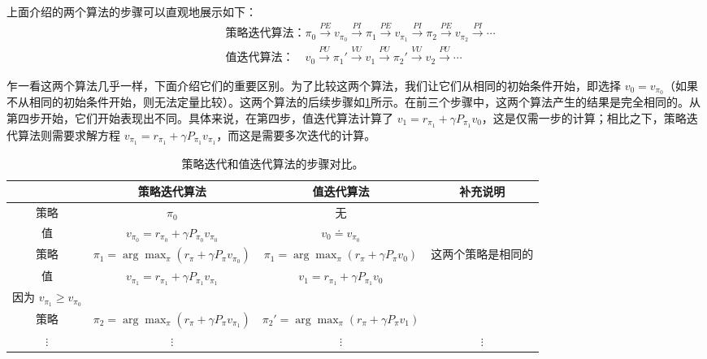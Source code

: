 上面介绍的两个算法的步骤可以直观地展示如下：
$$
\begin{aligned}
&\text{策略迭代算法：} \pi_{0} \xrightarrow{PE} v_{\pi_{0}} \xrightarrow{PI} \pi_{1} \xrightarrow{PE} v_{\pi_{1}} \xrightarrow{PI} \pi_{2} \xrightarrow{PE} v_{\pi_{2}} \xrightarrow{PI} \cdots \\
&\text{值迭代算法：} \quad v_{0} \xrightarrow{PU} \pi_{1}' \xrightarrow{VU} v_{1} \xrightarrow{PU} \pi_{2}' \xrightarrow{VU} v_{2} \xrightarrow{PU} \cdots
\end{aligned}
$$

乍一看这两个算法几乎一样，下面介绍它们的重要区别。为了比较这两个算法，我们让它们从相同的初始条件开始，即选择 $v_{0} = v_{\pi_{0}}$（如果不从相同的初始条件开始，则无法定量比较）。这两个算法的后续步骤如\cref{tab:rl-vpi-compare}所示。在前三个步骤中，这两个算法产生的结果是完全相同的。从第四步开始，它们开始表现出不同。具体来说，在第四步，值迭代算法计算了 $v_{1} = r_{\pi_{1}} + \gamma P_{\pi_{1}} v_{0}$，这是仅需一步的计算；相比之下，策略迭代算法则需要求解方程 $v_{\pi_{1}} = r_{\pi_{1}} + \gamma P_{\pi_{1}} v_{\pi_{1}}$，而这是需要多次迭代的计算。

\begin{table}[H]
\centering
\caption{策略迭代和值迭代算法的步骤对比。}
\label{tab:rl-vpi-compare}
\begin{tabular}{cccc}
\toprule
 & 策略迭代算法 & 值迭代算法 & 补充说明 \\
\midrule
策略 & $\pi_0$ & 无 & \\
值 & $v_{\pi_0} = r_{\pi_0} + \gamma P_{\pi_0} v_{\pi_0}$ & $v_0 \doteq v_{\pi_0}$ & \\
策略 & $\pi_1 = \arg\max_\pi (r_\pi + \gamma P_\pi v_{\pi_0})$ & $\pi_1 = \arg\max_\pi (r_\pi + \gamma P_\pi v_0)$ & 这两个策略是相同的 \\
值 & $v_{\pi_1} = r_{\pi_1} + \gamma P_{\pi_1} v_{\pi_1}$ & $v_1 = r_{\pi_1} + \gamma P_{\pi_1} v_0$ & \shortstack{$v_{\pi_1} \geqslant v_1$ \\ 因为 $v_{\pi_1} \geqslant v_{\pi_0}$} \\
策略 & $\pi_2 = \arg\max_\pi (r_\pi + \gamma P_\pi v_{\pi_1})$ & $\pi_2' = \arg\max_\pi (r_\pi + \gamma P_\pi v_1)$ & \\
$\vdots$ & $\vdots$ & $\vdots$ & $\vdots$ \\
\bottomrule
\end{tabular}
\end{table}

